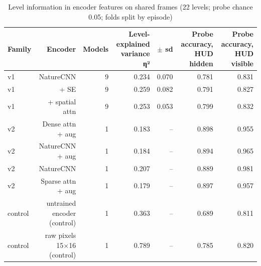 \begin{table}[t]
\centering
\caption{Level information in encoder features on shared frames (22 levels; probe chance 0.05; folds split by episode)}
\label{tab:probe_level_identity}
\begin{tabular}{lrrrrrr}
\toprule
Family & Encoder & Models & Level-explained variance η² & $\pm$ sd & Probe accuracy, HUD hidden & Probe accuracy, HUD visible \\
\midrule
v1 & NatureCNN & 9 & 0.234 & 0.070 & 0.781 & 0.831 \\
v1 & + SE & 9 & 0.259 & 0.082 & 0.791 & 0.827 \\
v1 & + spatial attn & 9 & 0.253 & 0.053 & 0.799 & 0.832 \\
v2 & Dense attn + aug & 1 & 0.183 & -- & 0.898 & 0.955 \\
v2 & NatureCNN + aug & 1 & 0.184 & -- & 0.894 & 0.965 \\
v2 & NatureCNN & 1 & 0.207 & -- & 0.889 & 0.981 \\
v2 & Sparse attn + aug & 1 & 0.179 & -- & 0.897 & 0.957 \\
control & untrained encoder (control) & 1 & 0.363 & -- & 0.689 & 0.811 \\
control & raw pixels 15$\times$16 (control) & 1 & 0.789 & -- & 0.785 & 0.820 \\
\bottomrule
\end{tabular}
\end{table}
